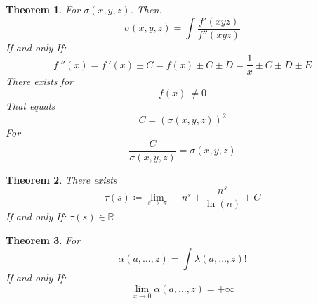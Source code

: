 \documentclass[10pt, twocolumn]{article}
\theoremstyle{plain}
\newtheorem{theorem}{Theorem}[section]
\theoremstyle{definition}
\theoremstyle{remark}
\begin{document}
\begin{theorem}
  For $\sigma(x, y, z)$. Then.
  \begin{equation}
    \sigma(x, y, z) = \int \frac{f'(x y z)}{f''(x y z)}
  \end{equation}
  If and only If:
  \begin{equation}
    f\:''\left(x\right)= f\:'\left(x\right)\pm C=f\left(x\right)\pm C \pm D=\frac{1}{x} \pm C \pm D \pm E
  \end{equation}
  There exists for
  \begin{equation}
    f\left(x\right)\:\ne 0
  \end{equation}
  That equals
  \begin{equation}
    C = (\sigma(x, y, z))^{2}
  \end{equation}
  For
  \begin{equation}
    \frac{C}{\sigma(x, y, z)} = \sigma(x, y, z)
  \end{equation}
\end{theorem}

\begin{theorem}
  There exists
  \begin{equation}
    \tau (s) \coloneq \lim _{s\to \:\pi } -n^s+\frac{n^s}{\ln \left(n\right)}\pm C
  \end{equation}
  If and only If: $\tau (s) \in \mathbb{R}$
\end{theorem}

\begin{theorem}
  For
  \begin{equation}
    \alpha(a, \dots, z) = \int \lambda(a, \dots, z)! 
  \end{equation}
  If and only If:
  \begin{equation}
    \lim_{x \to 0} \alpha(a, \dots, z) = +\infty
  \end{equation}
\end{theorem}
\end{document}
